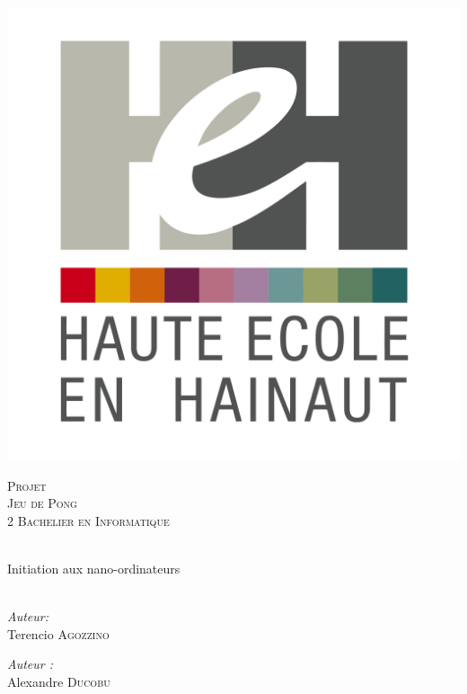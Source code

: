 \begin{center}
  \includegraphics[scale=0.12]{textures/logo/heh.pdf}

  \vspace{1cm}

  \textsc{\LARGE Projet} \\ [0.5cm]
  \textsc{\Large Jeu de Pong} \\ [0.5cm]

  \textsc{\large 2 Bachelier en Informatique} \\ [0.2cm]

  \begingroup
   \selectfont 

  \HRule \\ [0.4cm] {
    \huge Initiation aux nano-ordinateurs \\ [0.2cm] 
  }
  \HRule \\ [1.3cm]
  \endgroup

  \begin{minipage}[t]{0.4 \textwidth} 
    \begin{flushleft} 
      \large \emph{Auteur:} \\ 
      Terencio \textsc{Agozzino}
    \end{flushleft} 
  \end{minipage}
  \begin{minipage}[t]{0.4 \textwidth}
    \begin{flushright} 
      \large \emph{Auteur :} \\ 
      Alexandre \textsc{Ducobu}
    \end{flushright} 
  \end{minipage}


\end{center}
